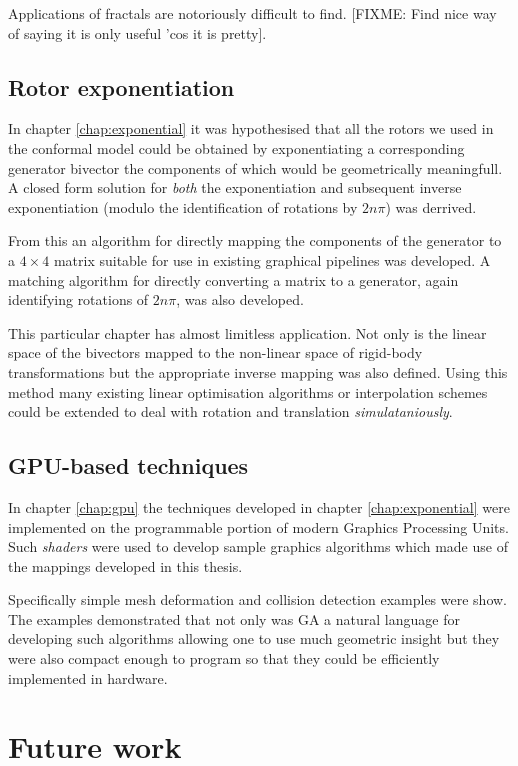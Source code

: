 Applications of fractals are notoriously difficult to find. [FIXME: Find nice way of
saying it is only useful 'cos it is pretty].

\subsection{Rotor exponentiation}

In chapter \ref{chap:exponential} it was hypothesised that all the rotors we
used in the conformal model could be obtained by exponentiating a corresponding
generator bivector the components of which would be geometrically meaningfull.
A closed form solution for \emph{both} the exponentiation and subsequent
inverse exponentiation (modulo the identification of rotations by $2n\pi$) was
derrived.

From this an algorithm for directly mapping the components of the generator
to a $4 \times 4$ matrix suitable for use in existing graphical pipelines
was developed. A matching algorithm for directly converting a matrix to
a generator, again identifying rotations of $2n\pi$, was also developed.

This particular chapter has almost limitless application. Not only is the
linear space of the bivectors mapped to the non-linear space of rigid-body
transformations but the appropriate inverse mapping was also defined. Using
this method many existing linear optimisation algorithms or interpolation
schemes could be extended to deal with rotation and translation
\emph{simulataniously}.

\subsection{GPU-based techniques}

In chapter \ref{chap:gpu} the techniques developed in chapter \ref{chap:exponential}
were implemented on the programmable portion of modern Graphics Processing
Units. Such \emph{shaders} were used to develop sample graphics algorithms which
made use of the mappings developed in this thesis. 

Specifically simple mesh deformation and collision detection examples were show.
The examples demonstrated that not only was GA a natural language for developing
such algorithms allowing one to use much geometric insight but they were also
compact enough to program so that they could be efficiently implemented in hardware.

\section{Future work}


